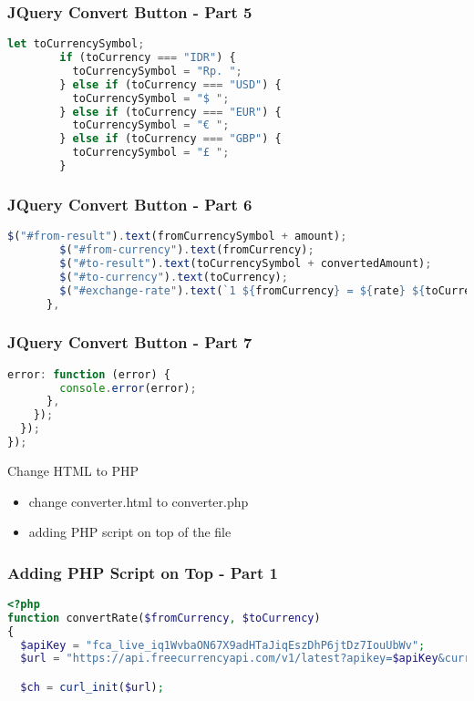 \documentclass[aspectratio=169, table]{beamer}
\begin{document}
\begin{frame}[fragile]
    \frametitle{JQuery Convert Button - Part 5}
    \begin{lstlisting}[language=JavaScript]
let toCurrencySymbol;
        if (toCurrency === "IDR") {
          toCurrencySymbol = "Rp. ";
        } else if (toCurrency === "USD") {
          toCurrencySymbol = "$ ";
        } else if (toCurrency === "EUR") {
          toCurrencySymbol = "€ ";
        } else if (toCurrency === "GBP") {
          toCurrencySymbol = "£ ";
        }
    \end{lstlisting}
\end{frame}

\begin{frame}[fragile]
    \frametitle{JQuery Convert Button - Part 6}
    \begin{lstlisting}[language=JavaScript]
$("#from-result").text(fromCurrencySymbol + amount);
        $("#from-currency").text(fromCurrency);
        $("#to-result").text(toCurrencySymbol + convertedAmount);
        $("#to-currency").text(toCurrency);
        $("#exchange-rate").text(`1 ${fromCurrency} = ${rate} ${toCurrency}`);
      },
    \end{lstlisting}
\end{frame}

\begin{frame}[fragile]
    \frametitle{JQuery Convert Button - Part 7}
    \begin{lstlisting}[language=JavaScript]
error: function (error) {
        console.error(error);
      },
    });
  });
});
    \end{lstlisting}
\end{frame}

\begin{frame}{Change HTML to PHP}
    \vskip-1cm
    \begin{itemize}
        \item change converter.html to converter.php
        \item adding PHP script on top of the file
    \end{itemize}
\end{frame}

\begin{frame}[fragile]
    \frametitle{Adding PHP Script on Top - Part 1}
    \begin{lstlisting}[language=PHP]
<?php
function convertRate($fromCurrency, $toCurrency)
{
  $apiKey = "fca_live_iq1WvbaON67X9adHTaJiqEszDhP6jtDz7IouUbWv";
  $url = "https://api.freecurrencyapi.com/v1/latest?apikey=$apiKey&currencies=$toCurrency&base_currency=$fromCurrency";

  $ch = curl_init($url);
    \end{lstlisting}
\end{frame}
\end{document}
